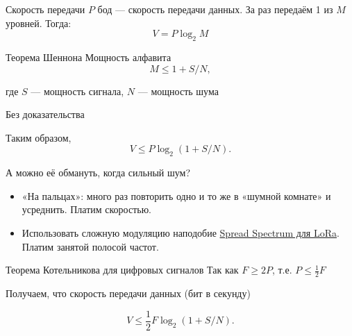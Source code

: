 \documentclass[xetex,aspectratio=43]{beamer}
\begin{document}
\begin{frame}{Скорость передачи}
	\(P\) бод --- скорость передачи данных. За раз передаём 1 из \(M\)
	уровней. Тогда: \[V = P \log_2 M\]
\end{frame}

\begin{frame}{Теорема Шеннона}
	Мощность алфавита \[M \le 1+S/N,\]

	где \(S\) --- мощность сигнала, \(N\) --- мощность шума

	Без доказательства

	\pause

	Таким образом, \[V \le P \log_2(1+S/N).\]

	\pause
	
	\begin{block}{А можно её обмануть, когда сильный шум?}
		\begin{itemize}
			\item «На пальцах»: много раз повторить одно и то же в «шумной комнате» и усреднить. Платим скоростью.
			\item Использовать сложную модуляцию наподобие \href{\ytlink{-piespM0M-k}}{Spread Spectrum для LoRa}. Платим занятой полосой частот.
		\end{itemize}
	\end{block}
	

\end{frame}

\begin{frame}{Теорема Котельникова для цифровых сигналов}
	Так как \(F \ge 2P\), т.е. \(P \le \frac{1}{2} F\)

	Получаем, что скорость передачи данных (бит в секунду)

	\[V \le \frac{1}{2} F \log_2 (1+S/N).\]
\end{frame}
\end{document}
